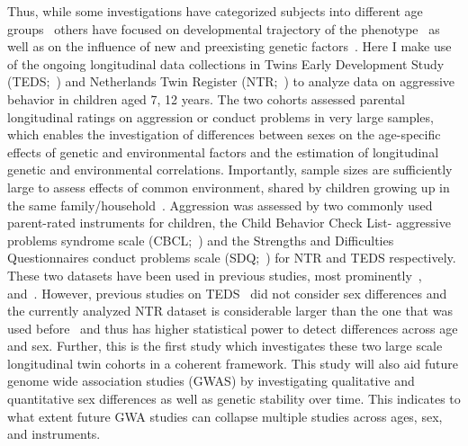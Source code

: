 Thus, while some investigations have categorized subjects into different age groups~\cite{Niv2013} others have focused on developmental trajectory of the phenotype~\cite{Pingault2015} as well as on the influence of new and preexisting genetic factors~\cite{vanBeijsterveldt2003}. 
Here I make use of the ongoing longitudinal data collections in Twins Early Development Study (TEDS;~\cite{Haworth2012}) and Netherlands Twin Register (NTR;~\cite{Willemsen2013a}) to analyze data on aggressive behavior in children aged 7, 12 years.
The two cohorts assessed parental longitudinal ratings on aggression or conduct problems in very large samples, which enables the investigation of differences between sexes on the age-specific effects of genetic and environmental factors and the estimation of longitudinal genetic and environmental correlations.
Importantly, sample sizes are sufficiently large to assess effects of common environment, shared by children growing up in the same family/household~\cite{Martin1978, Posthuma2000}. 
Aggression was assessed by two commonly used parent-rated instruments for children, the Child Behavior Check List- aggressive problems syndrome scale (CBCL;~\cite{Achenbach2003}) and the Strengths and Difficulties Questionnaires conduct problems scale (SDQ;~\cite{Goodman1997}) for NTR and TEDS respectively. 
These two datasets have been used in previous studies, most prominently~\citet{Lewis2015},~\citet{Pingault2015} and~\citet{vanBeijsterveldt2003}.
However, previous studies on TEDS~\cite{Lewis2015, Pingault2015} did not consider sex differences and the currently analyzed NTR dataset is considerable larger than the one that was used before~\cite{vanBeijsterveldt2003} and thus has higher statistical power to detect differences across age and sex.
Further, this is the first study which investigates these two large scale longitudinal twin cohorts in a coherent framework.
This study will also aid future genome wide association studies (GWAS) by investigating qualitative and quantitative sex differences as well as genetic stability over time.
This indicates to what extent future GWA studies can collapse multiple studies across ages, sex, and instruments.
